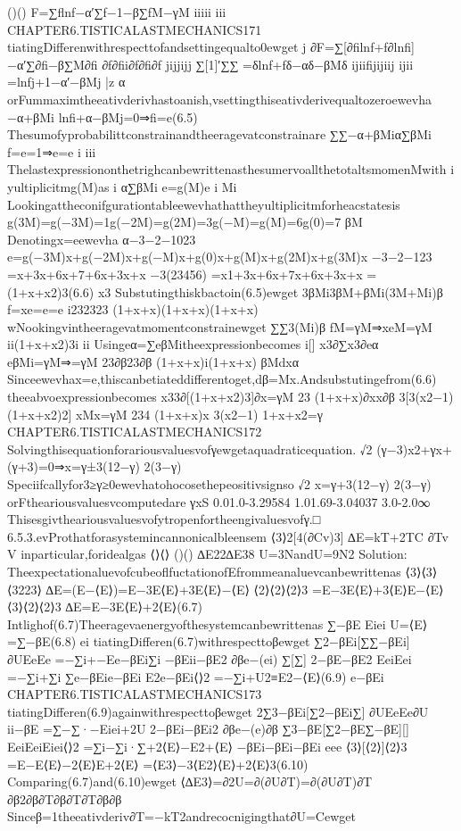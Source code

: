 {{{{{{{{{{()()
F=∑flnf−α′∑f−1−β∑fM−γM
iiiii
iii
CHAPTER6.TISTICALASTMECHANICS171
tiatingDifferenwithrespecttofandsettingequalto0ewget
j
∂F=∑[∂filnf+f∂lnfi]−α′∑∂fi−β∑M∂fi
∂f∂fii∂f∂fi∂f
jijjijj
∑[1]′∑∑
=δlnf+fδ−αδ−βMδ
ijiifijijiij
ijii
=lnfj+1−α′−βMj
|{z}
α
orFummaximtheeativderivhastoanish,vsettingthiseativderivequaltozeroewevha
−α+βMi
lnfi+α−βMj=0⇒fi=e(6.5)
Thesumofyprobabilittconstrainandtheeragevatconstrainare
∑∑−α+βMiα∑βMi
f=e=1⇒e=e
i
iii
ThelastexpressiononthetrighcanbewrittenasthesumervoallthetotaltsmomenMwith
i
yultiplicitmg(M)as
i
α∑βMi
e=g(M)e
i
Mi
Lookingattheconifgurationtableewevhathattheyultiplicitmforheacstatesis
g(3M)=g(−3M)=1g(−2M)=g(2M)=3g(−M)=g(M)=6g(0)=7
βM
Denotingx=eewevha
α−3−2−1023
e=g(−3M)x+g(−2M)x+g(−M)x+g(0)x+g(M)x+g(2M)x+g(3M)x
−3−2−123
=x+3x+6x+7+6x+3x+x
−3(23456)
=x1+3x+6x+7x+6x+3x+x
=(1+x+x2)3(6.6)
x3
Substutingthiskbactoin(6.5)ewget
3βMi3βM+βMi(3M+Mi)β
f=xe=e=e
i232323
(1+x+x)(1+x+x)(1+x+x)
wNookingvintheeragevatmomentconstrainewget
∑∑3(Mi)β
fM=γM⇒xeM=γM
ii(1+x+x2)3i
ii
Usingeα=∑eβMitheexpressionbecomes
i[]
x3∂∑x3∂eα
eβMi=γM⇒=γM
23∂β23∂β
(1+x+x)i(1+x+x)
βMdxα
Sinceewevhax=e,thiscanbetiateddifferentoget,dβ=Mx.Andsubstutingefrom(6.6)
theeabvoexpressionbecomes
x33∂[(1+x+x2)3]∂x=γM
23
(1+x+x)∂xx∂β
3[3(x2−1)(1+x+x2)2]
xMx=γM
234
(1+x+x)x
3(x2−1)
1+x+x2=γ
CHAPTER6.TISTICALASTMECHANICS172
Solvingthisequationforariousvaluesvofγewgetaquadraticequation.
√2
(γ−3)x2+γx+(γ+3)=0⇒x=γ±3(12−γ)
2(3−γ)
Speciifcallyfor3≥γ≥0ewevhatohocosethepeositivsignso
√2
x=γ+3(12−γ)
2(3−γ)
orFtheariousvaluesvcomputedare
γxS
0.01.0-3.29584
1.01.69-3.04037
3.0-2.0∞
Thisesgivtheariousvaluesvofytropenfortheengivaluesvofγ.□
6.5.3.evProthatforasystemincannonicalbleensem
⟨3⟩2[4(∂Cv)3]
∆E=kT+2TC
∂Tv
V
inparticular,foridealgas
⟨⟩⟨⟩
()()
∆E22∆E38
U=3NandU=9N2
Solution:
TheexpectationaluevofcubeoflfuctationofEfrommeanaluevcanbewrittenas
⟨3⟩⟨3⟩⟨3223⟩
∆E=(E−⟨E⟩)=E−3E⟨E⟩+3E⟨E⟩−⟨E⟩
⟨2⟩⟨2⟩⟨2⟩3
=E−3E⟨E⟩+3⟨E⟩E−⟨E⟩
⟨3⟩⟨2⟩⟨2⟩3
∆E=E−3E⟨E⟩+2⟨E⟩(6.7)
Intlighof(6.7)Theeragevaenergyofthesystemcanbewrittenas
∑−βE
Eiei
U=⟨E⟩=∑−βE(6.8)
ei
tiatingDifferen(6.7)withrespecttoβewget
∑2−βEi[∑∑−βEi]
∂UEeEe
=−∑i+−Ee−βEi∑i
−βEii−βE2
∂βe−(ei)
∑[∑]
2−βE−βE2
EeiEei
=−∑i+∑i
∑e−βEie−βEi
E2e−βEi⟨⟩2
=−∑i+U2≡E2−⟨E⟩(6.9)
e−βEi
CHAPTER6.TISTICALASTMECHANICS173
tiatingDifferen(6.9)againwithrespecttoβewget
2∑3−βEi[∑2−βEi∑]
∂UEeEe∂U
ii−βE
=∑−∑·−Eiei+2U
2−βEi−βEi2
∂βe−(e)∂β
∑3−βE[∑2−βE∑−βE][]
EeiEeiEiei⟨⟩2
=∑i−∑i·∑+2⟨E⟩−E2+⟨E⟩
−βEi−βEi−βEi
eee
⟨3⟩[⟨2⟩]⟨2⟩3
=E−E⟨E⟩−2⟨E⟩E+2⟨E⟩
=⟨E3⟩−3⟨E2⟩⟨E⟩+2⟨E⟩3(6.10)
Comparing(6.7)and(6.10)ewget
⟨∆E3⟩=∂2U=∂(∂U∂T)=∂(∂U∂T)∂T
∂β2∂β∂T∂β∂T∂T∂β∂β
Sinceβ=1theeativderiv∂T=−kT2andrecocnigingthat∂U=Cewget
}}}}}}}}}}

